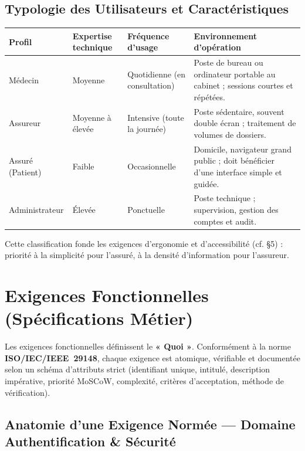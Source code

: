 \documentclass[11pt,a4paper]{article}
\begin{document}
\subsection{Typologie des Utilisateurs et Caractéristiques}

\begin{center}
\begin{longtable}{|L{2.6cm}|L{3.0cm}|L{3.0cm}|L{4.4cm}|}
\hline
{}\textbf{Profil} & \textbf{Expertise technique} & \textbf{Fréquence d'usage} & \textbf{Environnement d'opération}\\\hline
\endhead
Médecin & Moyenne & Quotidienne (en consultation) & Poste de bureau ou ordinateur portable au cabinet ; sessions courtes et répétées.\\\hline
Assureur & Moyenne à élevée & Intensive (toute la journée) & Poste sédentaire, souvent double écran ; traitement de volumes de dossiers.\\\hline
Assuré (Patient) & Faible & Occasionnelle & Domicile, navigateur grand public ; doit bénéficier d'une interface simple et guidée.\\\hline
Administrateur & Élevée & Ponctuelle & Poste technique ; supervision, gestion des comptes et audit.\\\hline
\end{longtable}
\end{center}

Cette classification fonde les exigences d'ergonomie et d'accessibilité (cf. §5) :
priorité à la simplicité pour l'assuré, à la densité d'information pour l'assureur.

\section{Exigences Fonctionnelles (Spécifications Métier)}

Les exigences fonctionnelles définissent le \textbf{« Quoi »}. Conformément à la
norme \textbf{ISO/IEC/IEEE~29148}, chaque exigence est atomique, vérifiable et
documentée selon un schéma d'attributs strict (identifiant unique, intitulé,
description impérative, priorité MoSCoW, complexité, critères d'acceptation, méthode
de vérification).

\subsection{Anatomie d'une Exigence Normée — Domaine Authentification \& Sécurité}
\end{document}
